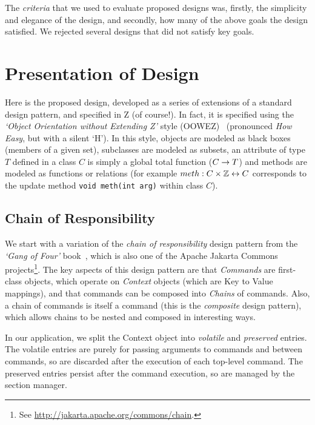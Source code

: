 \documentclass{llncs} %
\begin{document}
The \emph{criteria} that we used to evaluate proposed
designs was, firstly, the simplicity and elegance of the design,
and secondly, how many of the above goals the design satisfied.
We rejected several designs that did not satisfy key goals.


\section{Presentation of Design}

Here is the proposed design, developed as a series of extensions of a 
standard design pattern, and specified in Z (of course!).
In fact, it is specified using the \emph{`Object Orientation without
  Extending Z'} style (OOWEZ)~\cite{utting:oo-z03} (pronounced \emph{How
  Easy}, but with a silent `H').
In this style, objects are modeled as black boxes (members of a given set),
subclasses are modeled as subsets, an attribute of type $T$ defined
in a class $C$ is simply a global total function ($C \fun T$) and
methods are modeled as functions or relations (for example $meth : C \cross
\num \rel C$ corresponds to the update method \texttt{void meth(int arg)}
within class $C$).

\subsection{Chain of Responsibility}

We start with a variation of the \emph{chain of responsibility} design
pattern from the \emph{`Gang of Four'} book~\cite{gamma:design-patts95},
which is also one of the Apache Jakarta Commons
projects\footnote{See \url{http://jakarta.apache.org/commons/chain}.}. 
The key aspects of this design pattern are that \emph{Commands} are
first-class objects, which operate on \emph{Context} objects (which are
Key to Value mappings), and that commands can be composed into
\emph{Chains} of commands.  Also, a chain of commands is itself
a command (this is the \emph{composite} design pattern), which allows
chains to be nested and composed in interesting ways.

In our application, we split the Context object into \emph{volatile}
and \emph{preserved} entries.  The volatile entries are purely for
passing arguments to commands and between commands, so are discarded after
the execution of each top-level command.  The preserved entries persist
after the command execution, so are managed by the section manager.
\end{document}
